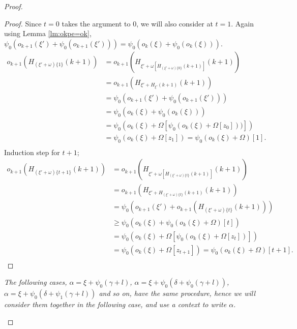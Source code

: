 \documentclass{amsart}
\theoremstyle{plain}
\theoremstyle{plain}
\newcommand{\Om}{{\Omega}}
\newcommand{\okpe}{o_{k+1}}
\newcommand{\ok}{o_{k}}
\newcommand{\al}{{\alpha}}
\newcommand{\ga}{\gamma}
\newcommand{\de}{\delta}
\newcommand{\om}{\omega}
\begin{document}
\begin{proof}
\begin{Cases}
\begin{Cases}
\begin{Cases}
\begin{proof}
                Since $t=0$ takes the argument to $0$, we will also consider at $t=1$.
                Again using  Lemma \ref{lm:okpe=ok}, $ \psi_0(\okpe(\xi') + \psi_0(\okpe(\xi'))) =  \psi_0(\ok(\xi) + \psi_0(\ok(\xi)))$.
                \begin{align*}
                    \okpe(H_{(\xi'+\om)\{1\}} (k+1)) &=\okpe(H_{\xi'+\om[H_{(\xi' + \om)\{0\}}(k+1)]}(k+1)) \\
                    &= \okpe(H_{\xi'+H_{\xi'}(k+1)}(k+1))\\
                    &= \psi_0(\okpe(\xi') + \psi_0(\okpe(\xi')))\\
                    &= \psi_0( \ok(\xi)+ \psi_0(\ok(\xi))) \\
                    &= \psi_0( \ok(\xi)+\Om[\psi_0(\ok(\xi) +\Om[z_0]))]) \\
                    &= \psi_0( \ok(\xi)+ \Om[z_1]) = \psi_0( \ok(\xi)+ \Om)[1].\\
                \end{align*}
                Induction step for $t+1$;
                \begin{align*}
                    \okpe(H_{(\xi'+\om)\{t+1\}} (k+1)) &=\okpe(H_{\xi'+\om[H_{(\xi'+\om)\{t\}}(k+1)]}(k+1)) \\
                    &= \okpe(H_{\xi'+H_{(\xi'+\om)\{t\}}(k+1)}(k+1)) \\
                    &=\psi_0(\okpe(\xi')+ \okpe(H_{(\xi'+\om)\{t\}}(k+1)))\\
                    &\geq \psi_0( \ok(\xi)+\psi_0(\ok(\xi)+ \Om)[t]) \\
                    &= \psi_0( \ok(\xi)+\Om[\psi_0(\ok(\xi)+ \Om[z_t])]) \\
                    &= \psi_0( \ok(\xi)+ \Om[z_{t+1}] ) = \psi_0( \ok(\xi)+ \Om)[t+1].\\
                \end{align*}
            \end{proof}
            
            { \em The following cases, $\al=\xi+\psi_0(\ga+l)$, $\al = \xi+\psi_0(\de+\psi_0(\ga+l))$, $\al= \xi+\psi_0(\de + \psi_1(\ga+l))$ and so on, have the same procedure, hence we will consider them together in the following case, and use a context to write $\al$.} \\
            

\end{Cases}
\end{Cases}
\end{Cases}
\end{proof}
\end{document}
